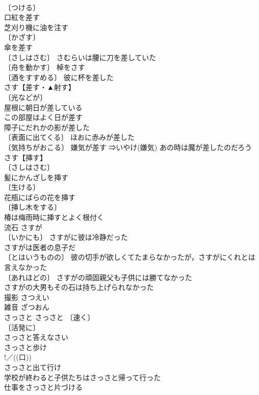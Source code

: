 \documentclass[8pt]{extreport}
\begin{document}
\begin{CJK}{UTF8}{min}
\\	〔つける〕
\\	口紅を差す 
\\	芝刈り機に油を注す 
\\	〔かざす〕
\\	傘を差す 
\\	〔さしはさむ〕 さむらいは腰に刀を差していた 
\\	〔舟を動かす〕 棹をさす 
\\	〔酒をすすめる〕 彼に杯を差した 
\\	さす【差す・▲射す】 
\\	〔光などが〕
\\	屋根に朝日が差している 
\\	この部屋はよく日が差す 
\\	障子にだれかの影が差した 
\\	〔表面に出てくる〕 ほおに赤みが差した 
\\	〔気持ちがおこる〕 嫌気が差す ⇒いやけ(嫌気) あの時は魔が差したのだろう 
\\	さす【挿す】 
\\	〔さしはさむ〕
\\	髪にかんざしを挿す 
\\	〔生ける〕
\\	花瓶にばらの花を挿す 
\\	〔挿し木をする〕
\\	椿は梅雨時に挿すとよく根付く 
\\	流石	さすが	
\\	〔いかにも〕 さすがに彼は冷静だった 
\\	さすがは医者の息子だ 
\\	〔とはいうものの〕 彼の切手が欲しくてたまらなかったが，さすがにくれとは言えなかった 
\\	〔あれほどの〕 さすがの頑固親父も子供には勝てなかった 
\\	さすがの大男もその石は持ち上げられなかった 
\\	撮影	さつえい	
\\	雑音	ざつおん	
\\	さっさと	さっさと	〔速く〕
\\	〔活発に〕
\\	さっさと答えなさい 
\\	さっさと歩け 
\\	!／((口)) 
\\	さっさと出て行け 
\\	学校が終わると子供たちはさっさと帰って行った 
\\	仕事をさっさと片づける 

\end{CJK}
\end{document}
